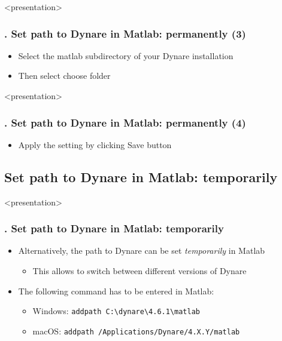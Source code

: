 \documentclass[11pt,aspectratio=169]{beamer}
\begin{document}
\begin{frame}<presentation>
\frametitle{{\thesection.\thesubsection} Set path to Dynare in Matlab: permanently (3)}
	\begin{itemize}
			\item Select the matlab subdirectory of your Dynare installation
				\begin{figure}
		\end{figure}
		\item Then select choose folder
	\end{itemize}
\end{frame}

\begin{frame}<presentation>
\frametitle{{\thesection.\thesubsection} Set path to Dynare in Matlab: permanently (4)}
	\begin{itemize}
			\item Apply the setting by clicking Save button
				\begin{figure}
		\end{figure}
	\end{itemize}
\end{frame}

\subsection{Set path to Dynare in Matlab: temporarily}

\begin{frame}<presentation>
\frametitle{{\thesection.\thesubsection} Set path to Dynare in Matlab: temporarily}
	\begin{itemize}
		\item Alternatively, the path to Dynare can be set \textit{temporarily} in Matlab
		\begin{itemize}
			\item This allows to switch between different versions of Dynare
		\end{itemize}
		\item The following command has to be entered in Matlab:
		\begin{itemize}
			\item Windows: \texttt{addpath C:\textbackslash dynare\textbackslash4.6.1\textbackslash matlab}
			\item macOS: \texttt{addpath /Applications/Dynare/4.X.Y/matlab}
		\end{itemize}
	\end{itemize}
\end{frame}


\end{document}
